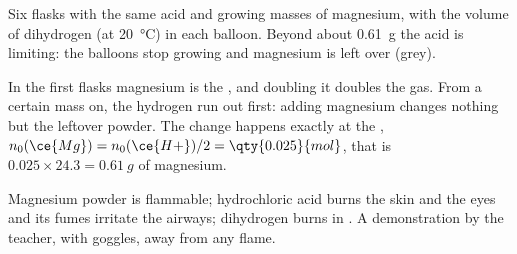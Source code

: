 \begin{omfigure}

{\small Six flasks with the same acid and growing masses of magnesium,
with the volume of dihydrogen (at \qty{20}{\celsius}) in each balloon.
Beyond about \qty{0.61}{g} the acid is limiting: the balloons stop
growing and magnesium is left over (grey).}
\end{omfigure}

\begin{remark}\label{rem:g10:reaction-progress-table:plateau}
In the first flasks magnesium is the , and doubling it
doubles the gas. From a certain mass on, the hydrogen  run out
first: adding magnesium changes nothing but the leftover powder. The
change happens exactly at the ,
$n_0(\ce{Mg}) = n_0(\ce{H+})/2 = \qty{0.025}{mol}$, that is
$0.025 \times 24.3 = \qty{0.61}{g}$ of magnesium.
\end{remark}

\begin{safety}{}
Magnesium powder is flammable; hydrochloric acid burns the skin and the
eyes and its fumes irritate the airways; dihydrogen burns in . A
demonstration by the teacher, with goggles, away from any flame.
\end{safety}


